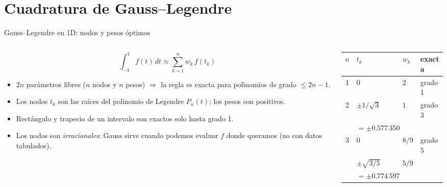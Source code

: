 \documentclass[aspectratio=169,10pt]{beamer}
\begin{document}
\section{Cuadratura de Gauss--Legendre}
\begin{frame}{Gauss--Legendre en 1D: nodos y pesos \'optimos}
\begin{columns}[T]
\begin{column}{0.52\textwidth}
\small
\[
\int_{-1}^{1} f(t)\,dt\approx\sum_{k=1}^{n} w_k\,f(t_k)
\]
\begin{itemize}
\item $2n$ par\'ametros libres ($n$ nodos y $n$ pesos) $\Rightarrow$ la regla es \alert{exacta para polinomios de grado $\le 2n-1$}.
\item Los nodos $t_k$ son las ra\'ices del polinomio de Legendre $P_n(t)$; los pesos son positivos.
\item Rect\'angulo y trapecio de un intervalo son exactos solo hasta grado 1.
\item Los nodos son \emph{irracionales}: Gauss sirve cuando podemos evaluar $f$ donde queramos (no con datos tabulados).
\end{itemize}
\end{column}
\begin{column}{0.44\textwidth}
\centering\small
\begin{tabular}{@{}clll@{}}
\toprule
$n$ & $t_k$ & $w_k$ & exacta\\
\midrule
1 & $0$ & $2$ & grado 1\\
\midrule
2 & $\pm1/\sqrt3$ & $1$ & grado 3\\
 & {\scriptsize$=\pm0.577\,350$} & & \\
\midrule
3 & $0$ & $8/9$ & grado 5\\
 & $\pm\sqrt{3/5}$ & $5/9$ & \\
 & {\scriptsize$=\pm0.774\,597$} & & \\
\bottomrule
\end{tabular}
\par\smallskip
{}
\end{column}
\end{columns}
\end{frame}
\end{document}

